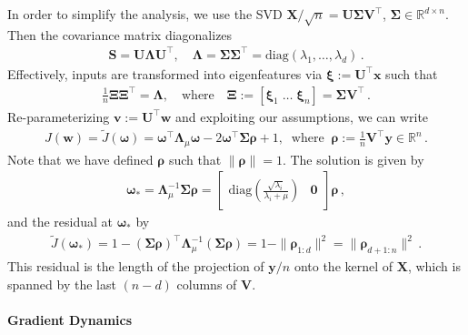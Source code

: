 \documentclass{article}
\newcommand{\w}{{\mathbf w}}
\renewcommand{\v}{{\mathbf v}}
\newcommand{\y}{{\mathbf y}}
\newcommand{\vRho}{{\bm \rho}}
\newcommand{\vOmega}{{\bm \omega}}
\newcommand{\mX}{{\mathbf X}}
\newcommand{\mU}{{\mathbf U}}
\newcommand{\mV}{{\mathbf V}}
\newcommand{\x}{{\mathbf x}}
\renewcommand{\Re}{{\mathbb R}}
\newcommand{\mSigma}{{\mathbf \Sigma}}
\newcommand{\mLambda}{{\mathbf \Lambda}}
\newcommand{\mXi}{{\mathbf \Xi}}
\newcommand{\vXi}{{\bm \xi}}
\newcommand{\mS}{{\mathbf S}}
\begin{document}
In order to simplify the analysis, we use the SVD $\mX / \sqrt n =   \mU \mSigma \mV^\top$, $\mSigma \in \Re^{d \times n}$. Then the covariance matrix diagonalizes
\begin{align}
\mS = \mU \mLambda \mU^\top, \quad \mLambda = \mSigma \mSigma^\top = \text{diag}(\lambda_1,\dots,\lambda_d)\,.
\end{align}
 Effectively, inputs are transformed into eigenfeatures via $\vXi :=  \mU^\top \x$ such that
%
\begin{align}
\tfrac 1n \mXi \mXi^\top = \mLambda, \quad \text{where} \quad \mXi := [\vXi_1\; \dots \; \vXi_n] = \mSigma \mV^\top\,.
\end{align}
Re-parameterizing $\v := \mU^\top \w$ and exploiting our assumptions, we can write
\begin{align}
J(\w) = \tilde J(\vOmega) = \vOmega^\top \mLambda_\mu \vOmega - 2 \vOmega^\top \mSigma  \vRho + 1, \;\;\text{where} \;\;  \vRho := \frac1n \mV^\top  \y \in \Re^n\,.
\end{align}
Note that we have defined $\vRho$ such that $\| \vRho\|=1$. The solution is given by 
\begin{align}
\vOmega_* = \mLambda_\mu^{-1} \mSigma \vRho = 
\begin{bmatrix}
\text{diag}\left( \frac{\sqrt{\lambda_i}}{\lambda_i + \mu} \right)
& \bm 0
\end{bmatrix}  \vRho\,,
\end{align}
and the residual at $\vOmega_*$ by 
\begin{align}
\tilde J(\vOmega_*) = 1 - (\mSigma \vRho)^\top \mLambda_\mu^{-1} (\mSigma \vRho)
= 1 - \| \vRho_{1:d}\|^2  =\| \vRho_{d+1:n} \|^2\,.
\end{align}
This residual is the length of the projection of $\y/n$ onto the kernel of $\mX$, which is spanned by the last $(n-d)$ columns of $\mV$.

\paragraph{Gradient Dynamics} 
\end{document}
